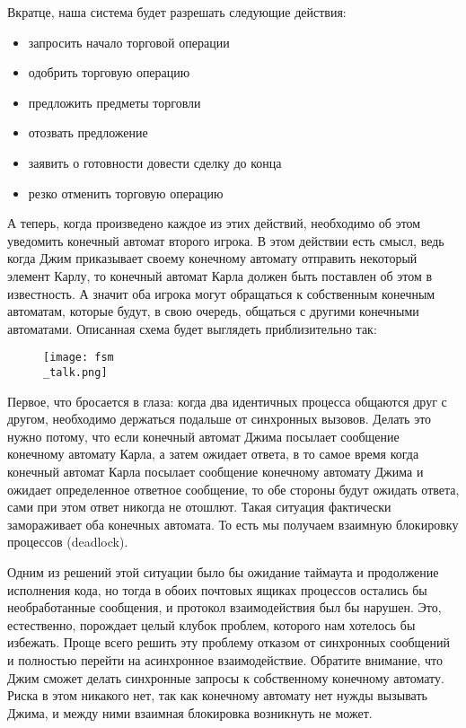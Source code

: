 Вкратце, наша система будет разрешать следующие действия:
\begin{itemize}
    \item запросить начало торговой  операции
    \item одобрить торговую операцию
    \item предложить предметы торговли
    \item отозвать предложение
    \item заявить о готовности довести сделку до конца
    \item резко отменить торговую операцию
\end{itemize}
А теперь, когда произведено каждое из этих действий, необходимо об этом уведомить конечный автомат второго игрока.
В этом действии есть смысл, ведь когда Джим приказывает своему конечному автомату отправить некоторый элемент Карлу, то конечный автомат Карла должен быть поставлен об этом в известность.
А значит оба игрока могут обращаться к собственным конечным автоматам, которые будут, в свою очередь, общаться с другими конечными автоматами.
Описанная схема будет выглядеть приблизительно так:

\begin{figure}[h!]
    \centering
    \texttt{[image: fsm\\\_talk.png]}
\end{figure}

Первое, что бросается в глаза: когда два идентичных процесса общаются друг с другом, необходимо держаться подальше от синхронных вызовов.
Делать это нужно потому, что если конечный автомат Джима посылает сообщение конечному автомату Карла, а затем ожидает ответа, в то самое время когда конечный автомат Карла посылает сообщение конечному автомату Джима и ожидает определенное ответное сообщение, то обе стороны будут ожидать ответа, сами при этом ответ никогда не отошлют.
Такая ситуация фактически замораживает оба конечных автомата.
То есть мы получаем взаимную блокировку процессов (deadlock).

Одним из решений этой ситуации было бы ожидание таймаута и продолжение исполнения кода, но тогда в обоих почтовых ящиках процессов остались бы необработанные сообщения, и протокол взаимодействия был бы нарушен.
Это, естественно, порождает целый клубок проблем, которого нам хотелось бы избежать.
Проще всего решить эту проблему отказом от синхронных сообщений и полностью перейти на асинхронное взаимодействие.
Обратите внимание, что Джим сможет делать синхронные запросы к собственному конечному автомату.
Риска в этом никакого нет, так как конечному автомату нет нужды вызывать Джима, и между ними взаимная блокировка возникнуть не может.

